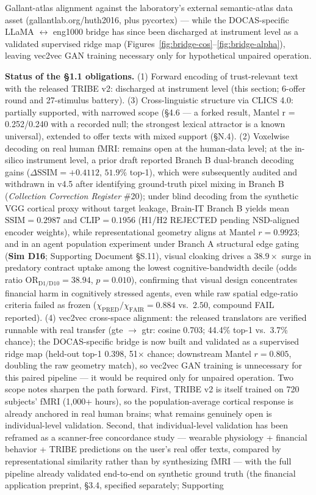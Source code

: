 \documentclass[11pt,twocolumn]{article}
\theoremstyle{plain}
\begin{document}
Gallant-atlas alignment against the laboratory's external semantic-atlas data asset (gallantlab.org/huth2016, plus pycortex) --- while the DOCAS-specific LLaMA $\leftrightarrow$ eng1000 bridge has since been discharged at instrument level as a validated supervised ridge map (Figures~\ref{fig:bridge-cos}--\ref{fig:bridge-alpha}), leaving vec2vec GAN training necessary only for hypothetical unpaired operation.

\textbf{Status of the \S{}1.1 obligations.} (1) Forward encoding of trust-relevant text with the released TRIBE v2: discharged at instrument level (this section; 6-offer round and 27-stimulus battery). (3) Cross-linguistic structure via CLICS 4.0: partially supported, with narrowed scope (\S{}4.6 — a forked result, Mantel r = 0.252/0.240 with a recorded null; the strongest lexical attractor is a known universal), extended to offer texts with mixed support (\S{}N.4). (2) Voxelwise decoding on real human fMRI: remains open at the human-data level; at the in-silico instrument level, a prior draft reported Branch B dual-branch decoding gains ($\Delta\text{SSIM} = +0.4112$, $51.9\%$ top-1), which were subsequently audited and withdrawn in v4.5 after identifying ground-truth pixel mixing in Branch B (\textit{Collection Correction Register} \#20); under blind decoding from the synthetic VGG cortical proxy without target leakage, Brain-IT \citep{beliy2026} Branch B yields mean $\text{SSIM} = 0.2987$ and $\text{CLIP} = 0.1956$ (H1/H2 REJECTED pending NSD-aligned encoder weights), while representational geometry aligns at Mantel $r = 0.9923$; and in an agent population experiment under Branch A structural edge gating (\textbf{Sim D16}; Supporting Document \S{}S.11), visual cloaking drives a $38.9\times$ surge in predatory contract uptake among the lowest cognitive-bandwidth decile (odds ratio $\text{OR}_{\text{D1}/\text{D10}} = 38.94$, $p = 0.010$), confirming that visual design concentrates financial harm in cognitively stressed agents, even while raw spatial edge-ratio criteria failed as frozen ($\chi_{\text{PRED}}/\chi_{\text{FAIR}} = 0.884$ vs.\ $2.50$, compound FAIL reported). (4) vec2vec cross-space alignment: the released translators are verified runnable with real transfer (gte $\to$ gtr: cosine 0.703; 44.4\% top-1 vs.\ 3.7\% chance); the DOCAS-specific bridge is now built and validated as a supervised ridge map (held-out top-1 0.398, 51$\times$ chance; downstream Mantel $r = 0.805$, doubling the raw geometry match), so vec2vec GAN training is unnecessary for this paired pipeline --- it would be required only for unpaired operation. Two scope notes sharpen the path forward. First, TRIBE v2 is itself trained on 720 subjects' fMRI (1,000+ hours), so the population-average cortical response is already anchored in real human brains; what remains genuinely open is individual-level validation. Second, that individual-level validation has been reframed as a scanner-free concordance study — wearable physiology + financial behavior + TRIBE predictions on the user's real offer texts, compared by representational similarity rather than by synthesizing fMRI — with the full pipeline already validated end-to-end on synthetic ground truth (the financial application preprint, \S{}3.4, specified separately; Supporting 
\end{document}
